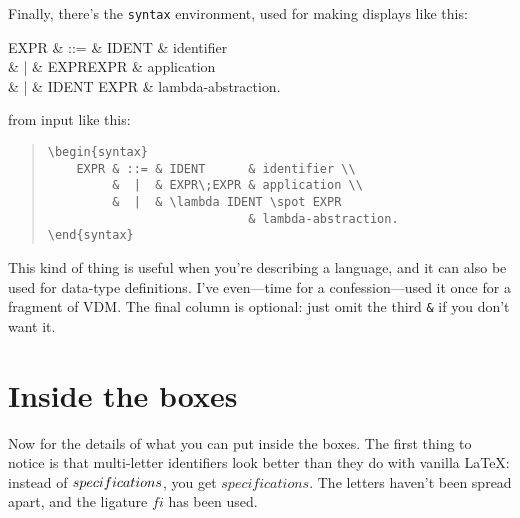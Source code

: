 Finally, there's the \verb|syntax| environment, used for
making displays like this:
\begin{syntax}
    EXPR & ::= & IDENT      & identifier \\
         &  |  & EXPR\;EXPR & application \\
         &  |  & \lambda IDENT \spot EXPR
                            & lambda-abstraction.
\end{syntax}
from input like this:
\begin{quote}
\begin{verbatim}
\begin{syntax}
    EXPR & ::= & IDENT      & identifier \\
         &  |  & EXPR\;EXPR & application \\
         &  |  & \lambda IDENT \spot EXPR
                            & lambda-abstraction.
\end{syntax}
\end{verbatim}
\end{quote}
This kind of thing is useful when you're describing a language,
and it can also be used for data-type definitions.
I've even---time for a confession---used it once for a fragment
of VDM\@.
The final column is optional:
just omit the third \verb|&| if you don't want it.

\section{Inside the boxes}

\makeatletter
\def\nota{\interzedlinepenalty=\interdisplaylinepenalty
        \@zed\halign\bgroup\strut\hbox to3em{$##$\hfil}\tabskip=0pt&##\hfil\cr}
\let\endnota=\endzed
\makeatother

Now for the details of what you can put inside the boxes.
The first thing to notice is that multi-letter identifiers look
better than they do with vanilla \LaTeX: instead of
$\mit specifications$, you get $specifications$.
The letters haven't been spread apart, and the ligature $fi$ has been
used.

